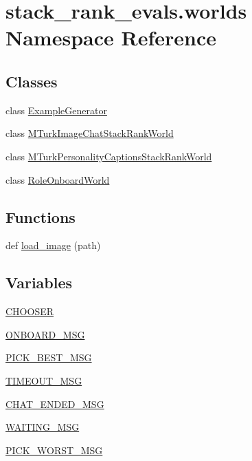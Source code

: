 \hypertarget{namespacestack__rank__evals_1_1worlds}{}\section{stack\+\_\+rank\+\_\+evals.\+worlds Namespace Reference}
\label{namespacestack__rank__evals_1_1worlds}
\subsection*{Classes}
\begin{DoxyCompactItemize}
\item 
class \hyperlink{classstack__rank__evals_1_1worlds_1_1ExampleGenerator}{Example\+Generator}
\item 
class \hyperlink{classstack__rank__evals_1_1worlds_1_1MTurkImageChatStackRankWorld}{M\+Turk\+Image\+Chat\+Stack\+Rank\+World}
\item 
class \hyperlink{classstack__rank__evals_1_1worlds_1_1MTurkPersonalityCaptionsStackRankWorld}{M\+Turk\+Personality\+Captions\+Stack\+Rank\+World}
\item 
class \hyperlink{classstack__rank__evals_1_1worlds_1_1RoleOnboardWorld}{Role\+Onboard\+World}
\end{DoxyCompactItemize}
\subsection*{Functions}
\begin{DoxyCompactItemize}
\item 
def \hyperlink{namespacestack__rank__evals_1_1worlds_a0174c3e372a345f192cef824e4c5528d}{load\+\_\+image} (path)
\end{DoxyCompactItemize}
\subsection*{Variables}
\begin{DoxyCompactItemize}
\item 
\hyperlink{namespacestack__rank__evals_1_1worlds_adcb17cc8044e10382cbbfb67b9269182}{C\+H\+O\+O\+S\+ER}
\item 
\hyperlink{namespacestack__rank__evals_1_1worlds_a1df1093274192b51afbb816d9eec0d9f}{O\+N\+B\+O\+A\+R\+D\+\_\+\+M\+SG}
\item 
\hyperlink{namespacestack__rank__evals_1_1worlds_aecdd5ad5571a4ff2f3a7eb1abcd407a7}{P\+I\+C\+K\+\_\+\+B\+E\+S\+T\+\_\+\+M\+SG}
\item 
\hyperlink{namespacestack__rank__evals_1_1worlds_a34525ffa547bdb8a98e0d8f3884246cd}{T\+I\+M\+E\+O\+U\+T\+\_\+\+M\+SG}
\item 
\hyperlink{namespacestack__rank__evals_1_1worlds_a71080d86e00a5024b9b9b0d61eb778de}{C\+H\+A\+T\+\_\+\+E\+N\+D\+E\+D\+\_\+\+M\+SG}
\item 
\hyperlink{namespacestack__rank__evals_1_1worlds_ad16875d09caf70042eff90b14ef6084e}{W\+A\+I\+T\+I\+N\+G\+\_\+\+M\+SG}
\item 
\hyperlink{namespacestack__rank__evals_1_1worlds_aef70ce34211a961eaf7acff969e398eb}{P\+I\+C\+K\+\_\+\+W\+O\+R\+S\+T\+\_\+\+M\+SG}
\end{DoxyCompactItemize}


